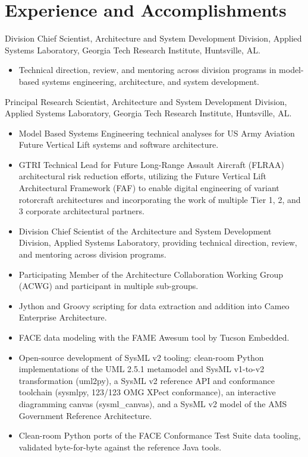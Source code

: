 \documentclass[american]{cv}
\begin{document}
\section{Experience and Accomplishments}

\begin{topic}

\item [January 2024 - Present] Division Chief Scientist, Architecture and
System Development Division, Applied Systems Laboratory, Georgia Tech
Research Institute, Huntsville, AL.

\begin{itemize}
\item Technical direction, review, and mentoring across division programs in
model-based systems engineering, architecture, and system development.
\end{itemize}

\item [September 2019 - Present] Principal Research Scientist, Architecture
and System Development Division, Applied Systems Laboratory, Georgia Tech
Research Institute, Huntsville, AL.

\begin{itemize}
\item Model Based Systems Engineering technical analyses for US Army Aviation
Future Vertical Lift systems and software architecture.
\item GTRI Technical Lead for Future Long-Range Assault Aircraft (FLRAA)
architectural risk reduction efforts, utilizing the Future Vertical Lift
Architectural Framework (FAF) to enable digital engineering of variant
rotorcraft architectures and incorporating the work of multiple Tier 1, 2,
and 3 corporate architectural partners.
\item Division Chief Scientist of the Architecture and System Development
Division, Applied Systems Laboratory, providing technical direction, review,
and mentoring across division programs.
\item Participating Member of the Architecture Collaboration Working Group
(ACWG) and participant in multiple sub-groups.
\item Jython and Groovy scripting for data extraction and addition into Cameo Enterprise
Architecture.
\item FACE data modeling with the FAME Awesum tool by Tucson Embedded.
\item Open-source development of SysML v2 tooling: clean-room Python
implementations of the UML 2.5.1 metamodel and SysML v1-to-v2 transformation
(uml2py), a SysML v2 reference API and conformance toolchain (sysmlpy, 123/123
OMG XPect conformance), an interactive diagramming canvas (sysml\_canvas), and
a SysML v2 model of the AMS Government Reference Architecture.
\item Clean-room Python ports of the FACE Conformance Test Suite data tooling,
validated byte-for-byte against the reference Java tools.
\end{itemize}


\end{topic}
\end{document}
